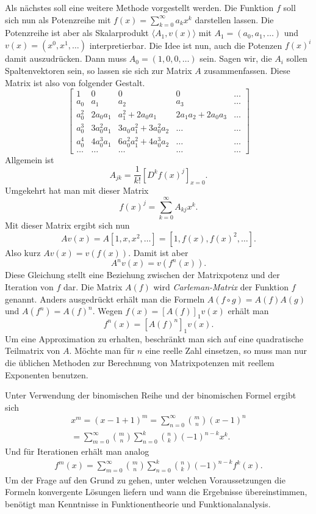 \documentclass[a4paper,10pt,fleqn,twocolumn,twoside]{article}
\begin{document}
Als nächstes soll eine weitere Methode vorgestellt werden. Die
Funktion $f$ soll sich nun als Potenzreihe mit
$f(x)=\sum_{k=0}^\infty a_kx^k$ darstellen lassen. Die Potenzreihe
ist aber als Skalarprodukt $\langle A_1,v(x)\rangle$ mit
$A_1=(a_0,a_1,\ldots)$ und $v(x)=(x^0,x^1,\ldots)$
interpretierbar. Die Idee ist nun, auch die Potenzen $f(x)^i$ damit
auszudrücken. Dann muss $A_0=(1,0,0,\ldots)$ sein. Sagen wir, die
$A_i$ sollen Spaltenvektoren sein, so lassen sie sich zur Matrix
$A$ zusammenfassen. Diese Matrix ist also von folgender Gestalt.
\[\begin{bmatrix}
1 & 0 & 0 & 0 & \ldots\\
a_0 & a_1 & a_2 & a_3 & \ldots\\
a_0^2 & 2a_0a_1 & a_1^2+2a_0a_1 & 2a_1a_2+2a_0a_3 &\ldots\\
a_0^3 & 3a_0^2a_1 & 3a_0a_1^2+3a_0^2a_2 &\ldots &\ldots\\
a_0^4 & 4a_0^3a_1 & 6a_0^2a_1^2+4a_0^3a_2 & \ldots & \ldots\\
\ldots &\ldots &\ldots &\ldots & \ldots
\end{bmatrix}\]
Allgemein ist
\[A_{jk} = \frac{1}{k!}[D^k f(x)^j]_{x=0}.\]
Umgekehrt hat man mit dieser Matrix
\[f(x)^j = \sum_{k=0}^\infty A_{kj} x^k.\]
Mit dieser Matrix ergibt sich nun
\[Av(x) = A[1,x,x^2,\ldots] = [1,f(x),f(x)^2,\ldots].\]
Also kurz $Av(x)=v(f(x))$. Damit ist aber
\[A^n v(x) = v(f^n(x)).\]
Diese Gleichung stellt eine Beziehung zwischen der Matrixpotenz und
der Iteration von $f$ dar. Die Matrix $A(f)$ wird
\textit{Carleman-Matrix}
der Funktion $f$ genannt. Anders ausgedrückt erhält man die Formeln
$A(f\circ g) = A(f)A(g)$ und $A(f^n)=A(f)^n$.
Wegen $f(x)=[A(f)]_1v(x)$ erhält man
\[f^n(x) = [A(f)^n]_1v(x).\]
Um eine Approximation zu erhalten, beschränkt man sich auf eine
quadratische Teilmatrix von $A$. Möchte man für $n$ eine reelle
Zahl einsetzen, so muss man nur die üblichen Methoden zur Berechnung
von Matrixpotenzen mit reellem Exponenten benutzen.

Unter Verwendung der binomischen Reihe und der binomischen Formel
ergibt sich
\begin{gather*}
x^m = (x-1+1)^m = \sum_{n=0}^\infty \binom{m}{n}(x-1)^n\\
= \sum_{m=0}^\infty \binom{m}{n}\sum_{n=0}^k\binom{n}{k}(-1)^{n-k}x^k.
\end{gather*}
Und für Iterationen erhält man analog
\begin{gather*}
f^m(x) = \sum_{m=0}^\infty \binom{m}{n}
\sum_{n=0}^k\binom{n}{k}(-1)^{n-k}f^k(x).
\end{gather*}
Um der Frage auf den Grund zu gehen, unter welchen Voraussetzungen
die Formeln konvergente Lösungen liefern und wann die Ergebnisse
übereinstimmen, benötigt man Kenntnisse in Funktionentheorie
und Funktionalanalysis.
\end{document}
